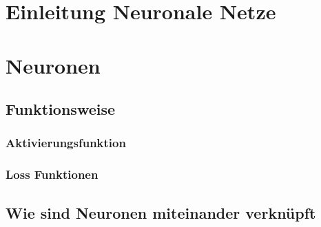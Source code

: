 \newpage
\thispagestyle{empty}
\section{Einleitung Neuronale Netze}\label{sec:einleitung_nn}   

\vspace{1cm}




\newpage  
\section{Neuronen}\label{sec:neuronen}
  
\newpage
\subsection{Funktionsweise}\label{subsec:neuronen:funktionsweise}
  
 
\subsubsection{Aktivierungsfunktion}\label{subsec:neuronen:aktivierungsfunktion}
   

\subsubsection{Loss Funktionen}

\newpage


\subsection{Wie sind Neuronen miteinander verknüpft}\label{subsec:neuronen:verknuepfung_neuronen}  
